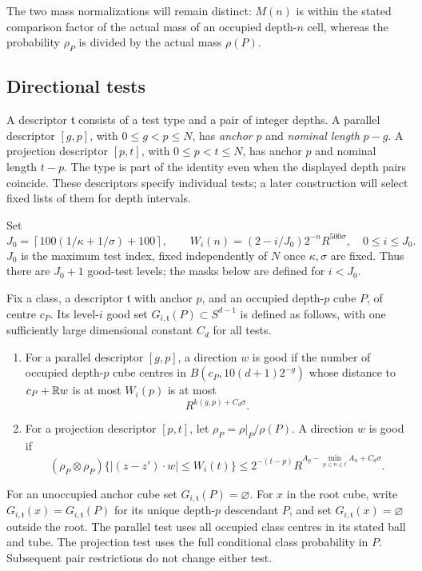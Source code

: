 The two mass normalizations will remain distinct: $M(n)$ is within the
stated comparison factor of the actual mass of an occupied depth-$n$ cell,
whereas the probability $\rho_P$ is divided by the actual mass $\rho(P)$.

\subsection{Directional tests}

A descriptor $\mathfrak t$ consists of a test type and a pair of integer
depths. A parallel descriptor $[g,p]$, with $0\le g<p\le N$, has
\emph{anchor} $p$ and \emph{nominal length} $p-g$. A projection descriptor
$[p,t]$, with $0\le p<t\le N$, has anchor $p$ and nominal length $t-p$.
The type is part of the identity even when the displayed depth pairs
coincide. These descriptors specify individual tests; a later construction
will select fixed lists of them for depth intervals.

Set
\[
J_0=\left\lceil100(1/\kappa+1/\sigma)+100\right\rceil,
\qquad
W_i(n)=(2-i/J_0)2^{-n}R^{500\sigma},
\quad0\le i\le J_0.
\]
$J_0$ is the maximum test index, fixed independently of $N$ once
$\kappa,\sigma$ are fixed. Thus there are $J_0+1$ good-test levels;
the masks below are defined for $i<J_0$.

\begin{definition}\label{test:good-directions}
Fix a class, a descriptor $\mathfrak t$ with anchor $p$, and an occupied
depth-$p$ cube $P$, of centre $c_P$.  Its level-$i$ good set
$G_{i,\mathfrak t}(P)\subset S^{d-1}$ is defined as follows, with one
sufficiently large dimensional constant $C_d$ for all tests.
\begin{enumerate}
\item For a parallel descriptor $[g,p]$, a direction $w$ is good if
      the number of occupied depth-$p$ cube centres in
      $B(c_P,10(d+1)2^{-g})$ whose distance to $c_P+\mathbb R w$ is at most
      $W_i(p)$ is at most
      \begin{equation}\label{test:parallel-threshold}
      R^{k(g,p)+C_d\sigma}.
      \end{equation}
\item For a projection descriptor $[p,t]$, let
      $\rho_P=\rho|_P/\rho(P)$.  A direction $w$ is good if
      \begin{equation}\label{test:projection-threshold}
      (\rho_P\otimes\rho_P)
      \{|(z-z')\cdot w|\le W_i(t)\}
      \le2^{-(t-p)}
           R^{A_p-\min_{p\le n\le t}A_n+C_d\sigma}.
      \end{equation}
\end{enumerate}
For an unoccupied anchor cube set $G_{i,\mathfrak t}(P)=\varnothing$.
For $x$ in the root cube, write
$G_{i,\mathfrak t}(x)=G_{i,\mathfrak t}(P)$ for its unique depth-$p$
descendant $P$, and set $G_{i,\mathfrak t}(x)=\varnothing$ outside the root.
The parallel test uses all occupied class centres in its stated ball and
tube. The projection test uses the full conditional class probability
in $P$. Subsequent pair
restrictions do not change either test.
\end{definition}

